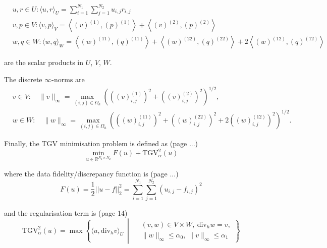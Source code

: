 \documentclass{article}
\begin{document}
\begin{equation}
\begin{aligned}
    & u, r \in U:\langle u, r\rangle_U = \sum_{i=1}^{N_1} \sum_{j=1}^{N_2} u_{i,j} r_{i,j} \\
    & v, p \in V:\langle v, p\rangle_V=\left\langle\left(v\right)^{(1)},\left(p\right)^{(1)}\right\rangle+\left\langle\left(v\right)^{(2)},\left(p\right)^{(2)}\right\rangle \\
    & w, q \in W:\langle w, q\rangle_W=\left\langle\left(w\right)^{(11)},\left(q\right)^{(11)}\right\rangle+\left\langle\left(w\right)^{(22)},\left(q\right)^{(22)}\right\rangle+2\left\langle\left(w\right)^{(12)},\left(q\right)^{(12)}\right\rangle
\end{aligned}
\end{equation}

are the scalar products in $U$, $V$, $W$.
\newline



The discrete $\infty\text{-norms}$ are
\begin{equation}
    \begin{aligned}
    & v \in V : \quad \|v\|_\infty = \max_{(i,j) \in \Omega_h} \left( \left( (v)_{i,j}^{(1)} \right)^{2} + \left( (v)_{i,j}^{(2)} \right)^{2} \right)^{1/2}, \\
    & w \in W : \quad \|w\|_\infty = \max_{(i,j) \in \Omega_h} \left( \left( (w)_{i,j}^{(11)} \right)^{2} + \left( (w)_{i,j}^{(22)} \right)^{2} + 2 \left( (w)_{i,j}^{(12)} \right)^{2} \right)^{1/2}.
\end{aligned}
\end{equation}


Finally, the TGV minimisation problem
is defined as (page ...)
\begin{equation}
    \min_{u \in \mathbb{R}^{N_1 \times N_2}} F(u) + \mathrm{TGV}^2_\alpha(u)
    \label{eq:tgv_minimisation_problem}
\end{equation}

where
the data fidelity/discrepancy function is (page ...)
\begin{equation}
    F(u) = \frac{1}{2} || u - f ||^2_2 = \sum_{i=1}^{N_1} \sum_{j=1}^{N_2} (u_{i,j} - f_{i,j})^2
\end{equation}

and
the regularisation term is (page 14)
\begin{equation}
    \mathrm{TGV}^2_\alpha(u) = \max \left\{ \langle u, \mathrm{div}_h v \rangle_U \ \middle| \ 
    \begin{aligned}
    &(v, w) \in V \times W, \ \mathrm{div}_h w = v, \\
    &\|w\|_\infty \leq \alpha_0, \ \|v\|_\infty \leq \alpha_1 
    \end{aligned}
    \right\}
\end{equation}
\end{document}
